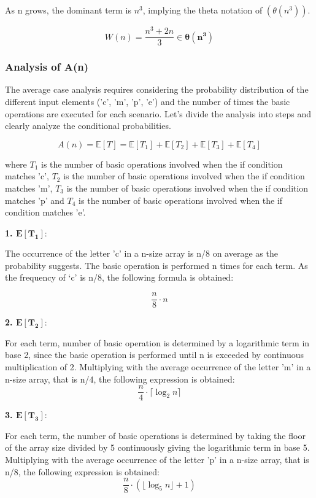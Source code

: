 \documentclass[11pt, oneside, a4paper]{article}
\begin{document}
As n grows, the dominant term is $n^3$, implying the theta notation of $(\theta(n^3))$.

\[
W(n) = \frac{n^3 + 2n}{3}  \in \boldsymbol{\theta(n^3)}
\]


\subsubsection{Analysis of A(n)}

 The average case analysis requires considering the probability distribution of the different input elements ('c', 'm', 'p', 'e') and the number of times the basic operations are executed for each scenario. Let's divide the analysis into steps and clearly analyze the conditional probabilities.

 \[
A(n) = \mathbb{E}[T] = \mathbb{E}[T_1] + \mathbb{E}[T_2] + \mathbb{E}[T_3] + \mathbb{E}[T_4]
\]

 where $T_1$ is the number of basic operations involved when the if condition matches 'c', $T_2$ is the number of basic operations involved when the if condition matches 'm', $T_3$ is the number of basic operations involved when the if condition matches 'p' and $T_4$ is the number of basic operations involved when the if condition matches 'e'.


\textbf{1. $\mathbf{E[T_1]}$}:


 The occurrence of the letter 'c' in a n-size array is n/8 on average as the probability suggests. The basic operation is performed n times for each term. As the frequency of ‘c’ is n/8, the following formula is obtained:
   
   \[
   \frac{n}{8} \cdot  n \]

   

\textbf{2. $\mathbf{E[T_2]}$}:

 For each term, number of basic operation is determined by a logarithmic term in base 2, since the basic operation is performed until n is exceeded by continuous multiplication of 2. Multiplying with the average occurrence of the letter 'm' in a n-size array, that is n/4, the following expression is obtained: 
\[
\frac{n}{4} \cdot \lceil \log_2 n \rceil
\]

\textbf{3. $\mathbf{E[T_3]}$}:

For each term, the number of basic operations is determined by taking the floor of the array size divided by 5 continuously giving the logarithmic term in base 5. Multiplying with the average occurrence of the letter 'p' in a n-size array, that is n/8, the following expression is obtained: 
\[ 
\frac{n}{8} \cdot \left( \lfloor \log_5 n \rfloor + 1 \right)
\]
\end{document}
